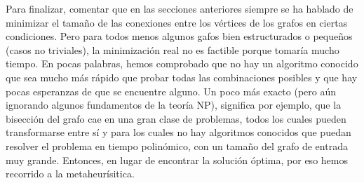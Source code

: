 Para finalizar, comentar que en las secciones anteriores siempre se ha hablado de minimizar el tamaño de las conexiones entre los vértices de los grafos en ciertas condiciones. Pero para todos menos algunos gafos bien estructurados o pequeños (casos no triviales), la minimización real no es factible porque tomaría mucho tiempo. En pocas palabras, hemos comprobado que no hay un algoritmo conocido que sea mucho más rápido que probar todas las combinaciones posibles y que hay pocas esperanzas de que se encuentre alguno. Un poco más exacto (pero aún ignorando algunos fundamentos de la teoría NP), significa por ejemplo, que la bisección del grafo cae en una gran clase de problemas, todos los cuales pueden transformarse entre sí y para los cuales no hay algoritmos conocidos que puedan resolver el problema en tiempo polinómico, con un tamaño del grafo de entrada muy grande. Entonces, en lugar de encontrar la solución óptima, por eso hemos recorrido a la metaheurísitica.